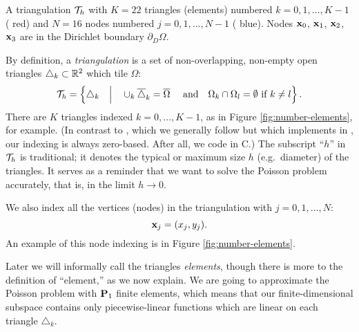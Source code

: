 \begin{marginfigure}

\caption{A triangulation $\mathcal{T}_h$ with $K=22$ triangles (elements) numbered $k=0,1,\dots,K-1$ ({\color{red} red}) and $N=16$ nodes numbered $j=0,1,\dots,N-1$  ({\color{blue} blue}).  Nodes $\mathbf{x}_0$, $\mathbf{x}_1$, $\mathbf{x}_2$, $\mathbf{x}_3$ are in the Dirichlet boundary $\partial_D\Omega$.}
\label{fig:number-elements}
\end{marginfigure}

By definition, a \emph{triangulation} is a set of non-overlapping, non-empty open triangles $\triangle_k\subset \mathbb{R}^2$ which tile $\Omega$:
\begin{equation*}
\mathcal{T}_h = \left\{\triangle_k \quad\Big|\quad \cup_k \overline{\triangle}_k = \overline{\Omega} \quad \text{ and} \quad \Omega_k \cap \Omega_l = \emptyset \text{ if } k\ne l\right\}.
\end{equation*}
There are $K$ triangles indexed $k=0,\dots,K-1$, as in Figure \ref{fig:number-elements}, for example.  (In contrast to \citet{Elmanetal2005}, which we generally follow but which implements in \Matlab, our indexing is always zero-based.  After all, we code in C.)  The subscript ``$h$'' in $\mathcal{T}_h$ is traditional; it denotes the typical or maximum size $h$ (e.g.~diameter) of the triangles.  It serves as a reminder that we want to solve the Poisson problem accurately, that is, in the limit $h\to 0$.

We also index all the vertices (nodes) in the triangulation with $j=0,1,\dots,N$:
\begin{equation*}
\mathbf{x}_j = (x_j,y_j).
\end{equation*}
An example of this node indexing is in Figure \ref{fig:number-elements}.

Later we will informally call the triangles \emph{elements}, though there is more to the definition of ``element,'' as we now explain.  We are going to approximate the Poisson problem with $\mathbf{P}_1$ finite elements, which means that our finite-dimensional subspace contains only piecewise-linear functions which are linear on each triangle $\triangle_k$.

